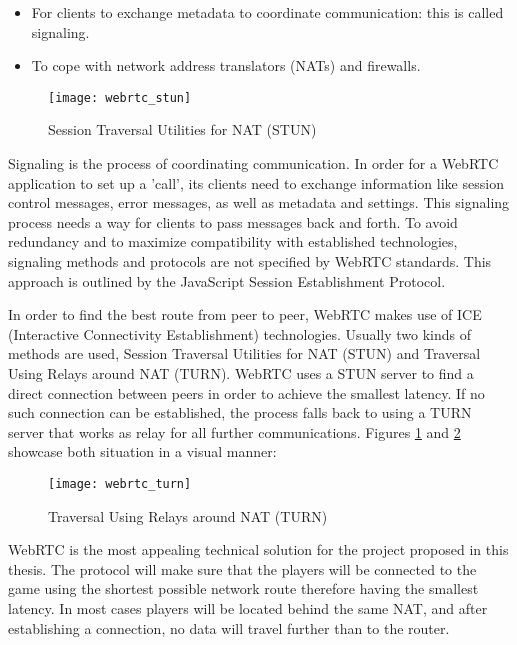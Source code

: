 \begin{itemize}

\item For clients to exchange metadata to coordinate communication: this is
called signaling.

\item To cope with network address translators (NATs) and firewalls.

\end{itemize}



\begin{figure}[!h]
\centering
\texttt{[image: webrtc\_stun]}
\caption{Session Traversal Utilities for NAT (STUN)}\label{fig:stun}
\end{figure}

Signaling is the process of coordinating communication. In order for a WebRTC
application to set up a 'call', its clients need to exchange information like
session control messages, error messages, as well as metadata and settings. This
signaling process needs a way for clients to pass messages back and forth. To
avoid redundancy and to maximize compatibility with established technologies,
signaling methods and protocols are not specified by WebRTC standards. This
approach is outlined by the JavaScript Session Establishment
Protocol\cite{jsep}.

In order to find the best route from peer to peer, WebRTC makes use of ICE
(Interactive Connectivity Establishment) technologies. Usually two kinds of
methods are used, Session Traversal Utilities for NAT (STUN) and Traversal Using
Relays around NAT (TURN). WebRTC uses a STUN server to find a direct connection
between peers in order to achieve the smallest latency. If no such connection
can be established, the process falls back to using a TURN server that works as
relay for all further communications. Figures \ref{fig:stun} and \ref{fig:turn}
showcase both situation in a visual manner:

\begin{figure}[!h]
\centering
\texttt{[image: webrtc\_turn]}
\caption{Traversal Using Relays around NAT (TURN)}\label{fig:turn}
\end{figure}

WebRTC is the most appealing technical solution for the project proposed in this
thesis. The protocol will make sure that the players will be connected to the
game using the shortest possible network route therefore having the smallest
latency. In most cases players will be located behind the same NAT, and after
establishing a connection, no data will travel further than to the router.


